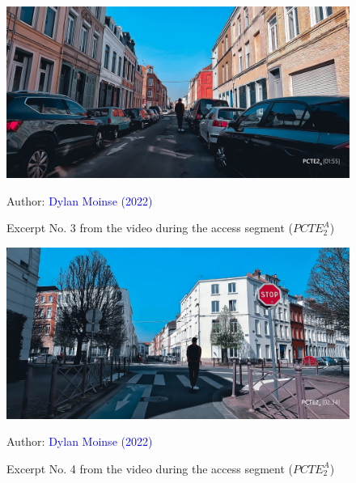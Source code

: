    \begin{figure}[h!]\vspace*{4pt}
        \caption*{Excerpt No. 3 from the video during the access segment (\(PCTE^{A}_{2}\))}
        \centerline{\includegraphics[width=0.75\columnwidth]{src/Figures/Annexes/Extrait_Video_PCTE2_Access_3.jpg}}
        \vspace{5pt}
        \begin{flushright}\scriptsize{
        Author: \textcolor{blue}{Dylan Moinse (2022)}
        }\end{flushright}
    \end{figure}

    \begin{figure}[h!]\vspace*{4pt}
        \caption*{Excerpt No. 4 from the video during the access segment (\(PCTE^{A}_{2}\))}
        \centerline{\includegraphics[width=0.75\columnwidth]{src/Figures/Annexes/Extrait_Video_PCTE2_Access_4.jpg}}
        \vspace{5pt}
        \begin{flushright}\scriptsize{
        Author: \textcolor{blue}{Dylan Moinse (2022)}
        }\end{flushright}
    \end{figure}

